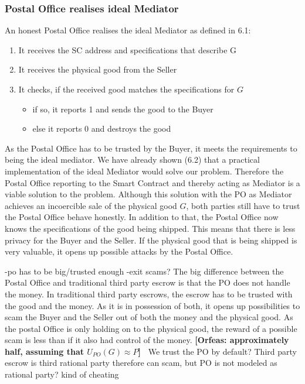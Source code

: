 \documentclass{cacthesis}
\newcommand{\authnote}[3]{{ \footnotesize \textbf{#1[#2: #3]~}}}
\newcommand{\orfnote}[1]{\authnote{\color{blue}}{Orfeas}{#1}}
\begin{document}
\subsubsection{Postal Office realises ideal Mediator}
An honest Postal Office realises the ideal Mediator as defined in 6.1:
\begin{enumerate}
    \item It receives the SC address and specifications that describe G
    \item It receives the physical good from the Seller
    \item It checks, if the received good matches the specifications for $G$
        \begin{itemize}
            \item if so, it reports 1 and sends the good to the Buyer
            \item else it reports 0 and destroys the good
        \end{itemize}
\end{enumerate}
As the Postal Office has to be trusted by the Buyer, it meets the requirements to being the ideal mediator. We have already shown (6.2) that a practical implementation of the ideal Mediator would solve our problem. Therefore the Postal Office reporting to the Smart Contract and thereby acting as Mediator is a viable solution to the problem.
Although this solution with the PO as Mediator achieves an incoercible sale of the physical good $G$, both parties still have to trust the Postal Office behave honestly.\newline
In addition to that, the Postal Office now knows the specifications of the good being shipped. This means that there is less privacy for the Buyer and the Seller. If the physical good that is being shipped is very valuable, it opens up possible attacks by the Postal Office.\newline

-po has to be big/trusted enough\newline
-exit scams?
The big difference between the Postal Office and traditional third party escrow is that the PO does not handle the money. \newline
In traditional third party escrows, the escrow has to be trusted with the good and the money. As it is in possession of both, it opens up possibilities to scam the Buyer and the Seller out of both the money and the physical good.\newline
As the postal Office is only holding on to the physical good, the reward of a
possible scam is less than if it also had control of the money.
\orfnote{approximately half, assuming that $U_{PO}(G) \approx P$}\newline
We trust the PO by default? Third party escrow is third rational party therefore can scam, but PO is not modeled as rational party? kind of cheating
\end{document}
